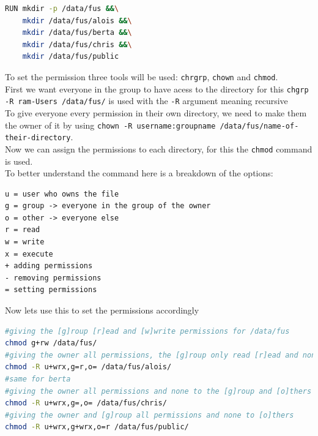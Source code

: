 \documentclass[a4paper]{article}
\begin{document}
\begin{lstlisting}[language=bash]
RUN mkdir -p /data/fus &&\
    mkdir /data/fus/alois &&\
    mkdir /data/fus/berta &&\
    mkdir /data/fus/chris &&\
    mkdir /data/fus/public
\end{lstlisting}
To set the permission three tools will be used: \texttt{chrgrp}, \texttt{chown} and \texttt{chmod}. \\
First we want everyone in the group  to have acess to the directory for this \texttt{chgrp -R ram-Users /data/fus/} is used with the \texttt{-R} argument meaning recursive  \cite{perms,chgrp}
\\To give everyone every permission in their own directory, we need to make them the owner of it by using \texttt{chown -R username:groupname /data/fus/name-of-their-directory}.\cite{chown} \\
Now we can assign the permissions to each directory, for this the \texttt{chmod}\cite{chmod} command is used. \\
To better understand the command here is a breakdown of the options: \\ 
\begin{lstlisting}
u = user who owns the file
g = group -> everyone in the group of the owner
o = other -> everyone else
r = read
w = write
x = execute
+ adding permissions
- removing permissions
= setting permissions
\end{lstlisting} \cite{chmod}
Now lets use this to set the permissions accordingly
\begin{lstlisting}[language=bash]
#giving the [g]roup [r]ead and [w]write permissions for /data/fus
chmod g+rw /data/fus/
#giving the owner all permissions, the [g]roup only read [r]ead and none to [o]thers
chmod -R u+wrx,g=r,o= /data/fus/alois/
#same for berta
#giving the owner all permissions and none to the [g]roup and [o]thers
chmod -R u+wrx,g=,o= /data/fus/chris/ 
#giving the owner and [g]roup all permissions and none to [o]thers
chmod -R u+wrx,g+wrx,o=r /data/fus/public/
\end{lstlisting} \cite{chmod}
\end{document}
